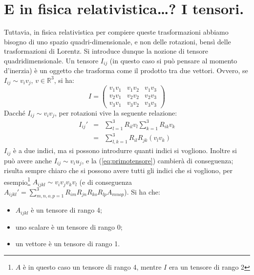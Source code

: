 \section{E in fisica relativistica\ldots? I tensori.}
 Tuttavia, in fisica
relativistica per compiere queste trasformazioni abbiamo bisogno di uno
spazio quadri-dimensionale, e non delle rotazioni, bens\`i delle
trasformazioni di Lorentz.  Si introduce dunque la nozione di tensore
quadridimensionale. Un tensore $I_{ij}$ (in questo caso
si pu\`o pensare al momento d'inerzia) \`e un oggetto che trasforma come
il prodotto tra due vettori. Ovvero, se $I_{ij}\sim v_i v_j$,
$v\in\mathbb{R}^3$, si ha:
\begin{equation}
I=\left(\begin{array}{ccc} v_1v_1 & v_1v_2 & v_1v_3\\
v_2v_1 & v_2v_2 & v_2v_3\\
v_3v_1 & v_3v_2 & v_3v_3 \end{array}\right)
\label{eq:primotensore}
\end{equation}
Dacch\'e $I_{ij}\sim v_i v_j$, per rotazioni vive la seguente
relazione:
\begin{eqnarray*}
I_{ij}'&=&\sum_{l=1}^3 R_{il}v_l\sum_{k=1}^3R_{ik}v_k\\
&=&\sum_{l,k=1}^{3}R_{il}R_{jk}(v_{l}v_{k})
\end{eqnarray*}
$I_{ij}$ \`e a due indici, ma si possono introdurre quanti indici
si vogliono. Inoltre si pu\`o avere anche $I_{ij}\sim v_i u_j$, e
la (\ref{eq:primotensore}) cambier\`a di conseguenza; risulta
sempre chiaro che si possono avere tutti gli indici che si
vogliono, per esempio\footnote{$A$ \`e in questo caso un
tensore di rango 4, mentre $I$ era un tensore di rango 2}
$A_{ijkl}\sim v_i v_j v_k v_l$ (e di conseguenza
$A_{ijkl}'=\sum_{m,n,o,p=1}^{3}R_{im}R_{jn}R_{ko}R_{lp}A_{mnop}$).
Si ha che:
\begin{itemize}
\item $A_{ijkl}$ \`e un tensore di rango 4;
\item uno scalare \`e un tensore di rango 0;
\item un vettore \`e un tensore di rango 1.
\end{itemize}
